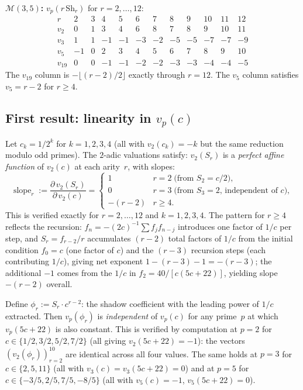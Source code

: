 \documentclass[11pt]{article}
\newcommand{\cM}{\mathcal{M}}
\begin{document}
\medskip
\noindent\textbf{$\cM(3,5)$:}
$v_p(r\,\mathrm{Sh}_r)$ for $r = 2, \ldots, 12$:
\[
\begin{array}{c|rrrrrrrrrrr}
r & 2 & 3 & 4 & 5 & 6 & 7 & 8 & 9 & 10 & 11 & 12 \\
\hline
v_2 & 0 & 1 & 3 & 4 & 6 & 8 & 7 & 8 & 9 & 10 & 11 \\
v_3 & 1 & 1 & -1 & -1 & -3 & -2 & -5 & -5 & -7 & -7 & -9 \\
v_5 & -1 & 0 & 2 & 3 & 4 & 5 & 6 & 7 & 8 & 9 & 10 \\
v_{19} & 0 & 0 & -1 & -1 & -2 & -2 & -3 & -3 & -4 & -4 & -5
\end{array}
\]
The $v_{19}$ column is $-\lfloor(r{-}2)/2\rfloor$ exactly
through $r = 12$.  The $v_5$ column satisfies $v_5 = r - 2$
for $r \ge 4$.

\subsection*{First result: linearity in $v_p(c)$}

Let $c_k = 1/2^k$ for $k = 1, 2, 3, 4$ (all with
$v_2(c_k) = -k$ but the same reduction modulo odd primes).
The $2$-adic valuations satisfy: $v_2(S_r)$ is a
\emph{perfect affine function} of $v_2(c)$ at each arity~$r$,
with slopes:
\[
\operatorname{slope}_r
:= \frac{\partial\, v_2(S_r)}{\partial\, v_2(c)}
= \begin{cases}
1 & r = 2\;\text{(from $S_2 = c/2$)}, \\[2pt]
0 & r = 3\;\text{(from $S_3 = 2$, independent of $c$)}, \\[2pt]
-(r-2) & r \ge 4.
\end{cases}
\]
This is verified exactly for $r = 2, \ldots, 12$ and
$k = 1, 2, 3, 4$.  The pattern for $r \ge 4$ reflects the
recursion: $f_n = -(2c)^{-1}\sum f_j f_{n-j}$ introduces one
factor of $1/c$ per step, and $S_r = f_{r-2}/r$ accumulates
$(r-2)$ total factors of $1/c$ from the initial condition
$f_0 = c$ (one factor of $c$) and the $(r-3)$ recursion steps
(each contributing $1/c$), giving net exponent
$1 - (r-3) - 1 = -(r-3)$; the additional $-1$ comes from the
$1/c$ in $f_2 = 40/[c(5c+22)]$, yielding slope $-(r-2)$
overall.

\begin{observation}
\label{obs:renormalised-shadow}
Define $\phi_r := S_r \cdot c^{r-2}$: the shadow coefficient with
the leading power of $1/c$ extracted.  Then $v_p(\phi_r)$ is
\emph{independent} of $v_p(c)$ for any prime~$p$ at which
$v_p(5c+22)$ is also constant.  This is verified by computation
at $p = 2$ for $c \in \{1/2, 3/2, 5/2, 7/2\}$ (all giving
$v_2(5c+22) = -1$): the vectors $(v_2(\phi_r))_{r=2}^{10}$ are
identical across all four values.  The same holds at $p = 3$ for
$c \in \{2, 5, 11\}$ (all with $v_3(c) = v_3(5c+22) = 0$) and
at $p = 5$ for $c \in \{-3/5, 2/5, 7/5, -8/5\}$ (all with
$v_5(c) = -1$, $v_5(5c+22) = 0$).
\end{observation}
\end{document}
